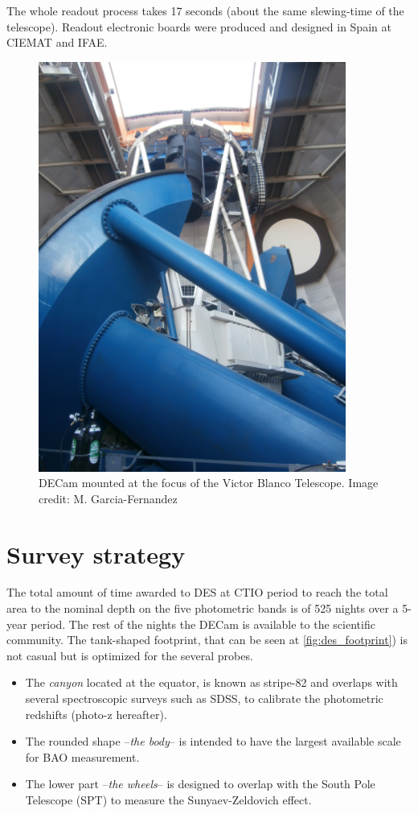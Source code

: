 The whole readout process takes 17 seconds (about the same slewing-time of the telescope). Readout electronic boards were produced and designed in Spain at CIEMAT and IFAE.
\begin{figure}
\begin{center}
\includegraphics[width=0.9\textwidth]{./Pictures/telescope_DES_mine.jpg}
\caption{DECam mounted at the focus of the Victor Blanco Telescope. Image credit: M. Garcia-Fernandez}
\label{fig:decam}
\end{center}
\end{figure}

\section{Survey strategy}
The total amount of time awarded to DES at CTIO period to reach the total area to the nominal depth on the five photometric bands is of 525 nights over a 5-year period. The rest of the nights the DECam is available to the scientific community. The tank-shaped footprint, that can be seen at \autoref{fig:des_footprint}) is not casual but is optimized for the several probes.
\begin{itemize}
	\item The {\it canyon} located at the equator, is known as stripe-82 and overlaps with several spectroscopic surveys such as SDSS, to calibrate the photometric redshifts (photo-z hereafter).
    \item The rounded shape --{\it the body}-- is intended to have the largest available scale for BAO measurement.
    \item The lower part --{\it the wheels}-- is designed to overlap with the South Pole Telescope (SPT) to measure the Sunyaev-Zeldovich effect.
\end{itemize}

